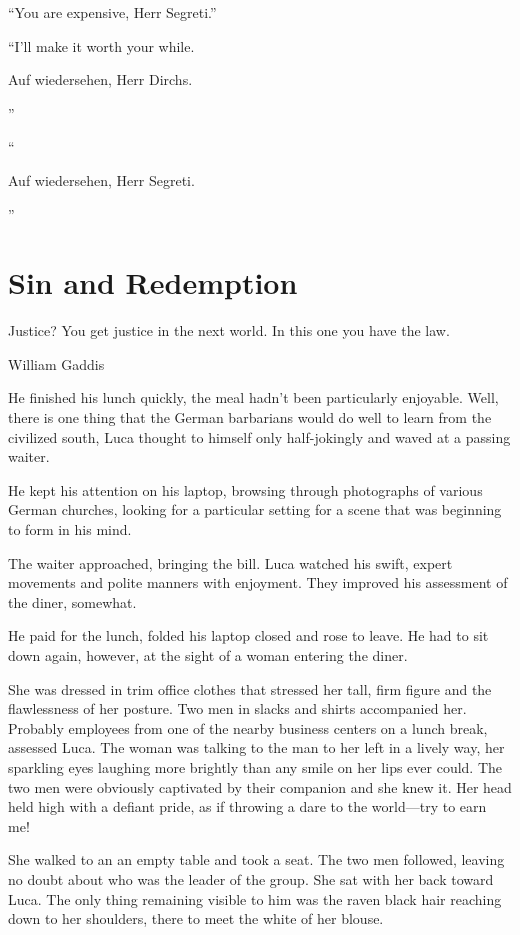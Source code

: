 ``You are expensive, Herr Segreti.''

``I'll make it worth your while. \begin{otherlanguage}{ngerman}Auf wiedersehen, Herr Dirchs.\end{otherlanguage}''

``\begin{otherlanguage}{ngerman}Auf wiedersehen, Herr Segreti.\end{otherlanguage}''

\chapter{Sin and Redemption}

\epigraph{Justice? You get justice in the next world. In this one you have the law.}{William Gaddis}

\firstparagraph

He finished his lunch quickly, the meal hadn't been particularly enjoyable. Well, there is one thing that the German barbarians would do well to learn from the civilized south, Luca thought to himself only half-jokingly and waved at a passing waiter.

He kept his attention on his laptop, browsing through photographs of various German churches, looking for a particular setting for a scene that was beginning to form in his mind.

The waiter approached, bringing the bill. Luca watched his swift, expert movements and polite manners with enjoyment. They improved his assessment of the diner, somewhat.

He paid for the lunch, folded his laptop closed and rose to leave. He had to sit down again, however, at the sight of a woman entering the diner.

She was dressed in trim office clothes that stressed her tall, firm figure and the flawlessness of her posture. Two men in slacks and shirts accompanied her. Probably employees from one of the nearby business centers on a lunch break, assessed Luca. The woman was talking to the man to her left in a lively way, her sparkling eyes laughing more brightly than any smile on her lips ever could. The two men were obviously captivated by their companion and she knew it. Her head held high with a defiant pride, as if throwing a dare to the world---try to earn me!

She walked to an an empty table and took a seat. The two men followed, leaving no doubt about who was the leader of the group. She sat with her back toward Luca. The only thing remaining visible to him was the raven black hair reaching down to her shoulders, there to meet the white of her blouse.

